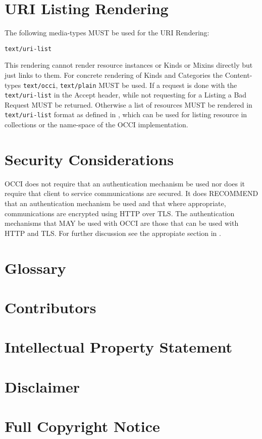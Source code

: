 \documentclass[10pt,a4paper]{article}
\begin{document}
\section{URI Listing Rendering}
\label{sec:urilist}
The following media-types MUST be used for the URI Rendering:

{\tt text/uri-list}

This rendering cannot render resource instances or Kinds or Mixins directly but just links to them. For concrete rendering of Kinds and Categories the Content-types \texttt{text/occi}, \texttt{text/plain} MUST be used. If a request is done with the \texttt{text/uri-list} in the Accept header, while not requesting for a Listing a Bad Request MUST be returned. Otherwise a list of resources MUST be rendered in \texttt{text/uri-list} format as defined in \cite{rfc2483}, which can be used for listing resource in collections or the name-space of the OCCI implementation.

\section{Security Considerations}
OCCI does not require that an authentication mechanism be used nor
does it require that client to service communications are secured. It
does RECOMMEND that an authentication mechanism be used and that where
appropriate, communications are encrypted using HTTP over TLS. The
authentication mechanisms that MAY be used with OCCI are those that
can be used with HTTP and TLS. For further discussion see the
appropiate section in \cite{occi:protocol}.

\section{Glossary}
\label{sec:glossary}


\section{Contributors}


\section{Intellectual Property Statement}


\section{Disclaimer}


\section{Full Copyright Notice}




\end{document}
